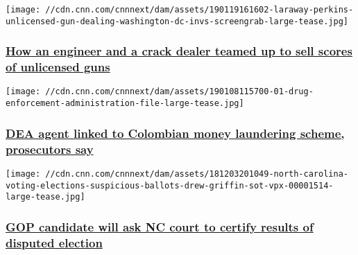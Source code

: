 \href{/2019/01/19/us/laraway-perkins-unlicensed-gun-dealing-washington-dc-invs/index.html}{}

\texttt{[image: //cdn.cnn.com/cnnnext/dam/assets/190119161602-laraway-perkins-unlicensed-gun-dealing-washington-dc-invs-screengrab-large-tease.jpg]}

\hypertarget{how-an-engineer-and-a-crack-dealer-teamed-up-to-sell-scores-of-unlicensed-guns}{%
\subsubsection{\texorpdfstring{\href{/2019/01/19/us/laraway-perkins-unlicensed-gun-dealing-washington-dc-invs/index.html}{How
an engineer and a crack dealer teamed up to sell scores of unlicensed
guns}}{How an engineer and a crack dealer teamed up to sell scores of unlicensed guns}}\label{how-an-engineer-and-a-crack-dealer-teamed-up-to-sell-scores-of-unlicensed-guns}}

\href{/2019/01/08/us/dea-agent-money-laundering-drug-scheme-invs/index.html}{}

\texttt{[image: //cdn.cnn.com/cnnnext/dam/assets/190108115700-01-drug-enforcement-administration-file-large-tease.jpg]}

\hypertarget{dea-agent-linked-to-colombian-money-laundering-scheme-prosecutors-say}{%
\subsubsection{\texorpdfstring{\href{/2019/01/08/us/dea-agent-money-laundering-drug-scheme-invs/index.html}{DEA
agent linked to Colombian money laundering scheme, prosecutors
say}}{DEA agent linked to Colombian money laundering scheme, prosecutors say}}\label{dea-agent-linked-to-colombian-money-laundering-scheme-prosecutors-say}}

\href{/2019/01/02/politics/north-carolina-election-board-district-9-hearing-postpone/index.html}{}

\texttt{[image: //cdn.cnn.com/cnnnext/dam/assets/181203201049-north-carolina-voting-elections-suspicious-ballots-drew-griffin-sot-vpx-00001514-large-tease.jpg]}

\hypertarget{gop-candidate-will-ask-nc-court-to-certify-results-of-disputed-election}{%
\subsubsection{\texorpdfstring{\href{/2019/01/02/politics/north-carolina-election-board-district-9-hearing-postpone/index.html}{GOP
candidate will ask NC court to certify results of disputed
election}}{GOP candidate will ask NC court to certify results of disputed election}}\label{gop-candidate-will-ask-nc-court-to-certify-results-of-disputed-election}}

